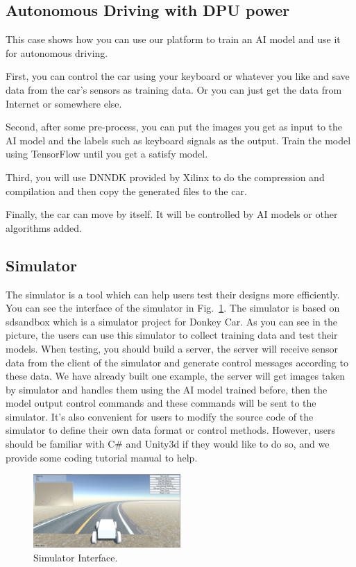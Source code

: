 \documentclass[conference]{IEEEtran}
\begin{document}
\begin{sloppypar}
\subsection{Autonomous Driving with DPU power}
This case shows how you can use our platform to train an AI model and use it for autonomous driving. 

First, you can control the car using your keyboard or whatever you like and save data from the car's sensors as training data. Or you can just get the data from Internet or somewhere else. 

Second, after some pre-process, you can put the images you get as input to the AI model and the labels such as keyboard signals as the output. Train the model using TensorFlow until you get a satisfy model.

Third, you will use DNNDK\cite{b17} provided by Xilinx to do the compression and compilation and then copy the generated files to the car.

Finally, the car can move by itself. It will be controlled by AI models or other algorithms added. 

\subsection{Simulator}
The simulator is a tool which can help users test their designs more efficiently. You can see the interface of the simulator in Fig.~\ref{si}. The simulator is based on sdsandbox\cite{b5} which is a simulator project for Donkey Car\cite{b34}. As you can see in the picture, the users can use this simulator to collect training data and test their models. 
When testing, you should build a server, the server will receive sensor data from the client of the simulator and generate control messages according to these data. We have already built one example, the server will get images taken by simulator and handles them using the AI model trained before, then the model output control commands and these commands will be sent to the simulator.
It's also convenient for users to modify the source code of the simulator to define their own data format or control methods. However, users should be familiar with C\# and Unity3d if they would like to do so, and we provide some coding tutorial manual to help.

\begin{figure}[htbp]
\centerline{\includegraphics[width=0.5\textwidth]{simulator.png}}
\caption{Simulator Interface.}
\label{si}
\end{figure}


\end{sloppypar}
\end{document}
